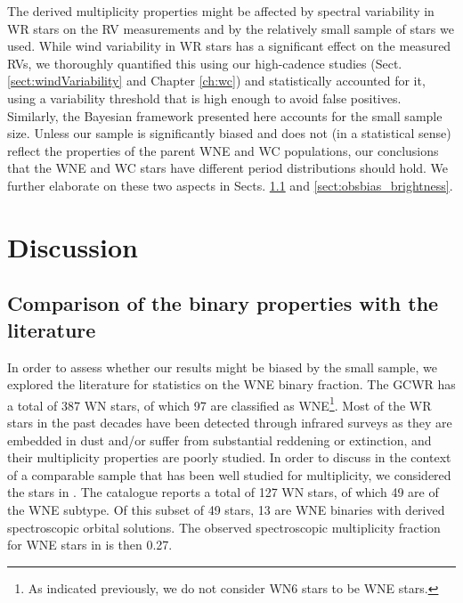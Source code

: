 The derived multiplicity properties might be affected by spectral variability in WR stars on the RV measurements and by the relatively small sample of stars we used. While wind variability in WR stars has a significant effect on the measured RVs, we thoroughly quantified this using our high-cadence studies (Sect. \ref{sect:windVariability} and Chapter \ref{ch:wc}) and statistically accounted for it, using a variability threshold that is high enough to avoid false positives. Similarly, the Bayesian framework presented here accounts for the small sample size. Unless our sample is significantly biased and does not (in a statistical sense) reflect the properties of the parent WNE and WC populations, our conclusions that the WNE and WC stars have different period distributions should hold. We further elaborate on these two aspects in Sects. \ref{sect:literature} and \ref{sect:obsbias_brightness}.

%
\section{Discussion}\label{sect:evolution}

\subsection{Comparison of the binary properties with the literature} \label{sect:literature}

In order to assess whether our results might be biased by the small sample, we explored the literature for statistics on the WNE binary fraction. The GCWR has a total of 387 WN stars, of which 97 are classified as WNE\footnote{As indicated previously, we do not consider WN6 stars to be WNE stars.}. Most of the WR stars in the past decades have been detected through infrared surveys as they are embedded in dust and/or suffer from substantial reddening or extinction, and their multiplicity properties are poorly studied. In order to discuss \fobsWNE{} in the context of a comparable sample that has been well studied for multiplicity, we considered the stars in . The catalogue reports a total of 127 WN stars, of which 49 are of the WNE subtype. Of this subset of 49 stars, 13 are WNE binaries with derived spectroscopic orbital solutions. The observed spectroscopic multiplicity fraction for WNE stars in  is then 0.27.

